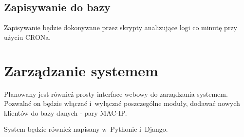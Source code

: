 \documentclass[a4paper,10pt]{article}
\begin{document}
	\subsection{Zapisywanie do bazy}
		Zapisywanie będzie dokonywane przez skrypty analizujące logi co minutę przy użyciu CRONa. 
\section{Zarządzanie systemem}
	Planowany jest również prosty interface webowy do zarządzania systemem. Pozwalać on będzie włączać i~wyłączać poszczególne moduły, dodawać nowych klientów do bazy danych - pary MAC-IP.
	
	System będzie również napisany w~Pythonie i~Django.
\end{document}
